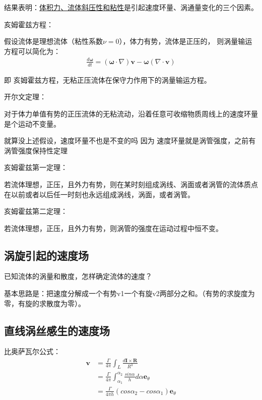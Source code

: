 \documentclass[UTF8,12pt]{article}
\begin{document}
结果表明：\uline{体积力、流体斜压性和粘性}是引起速度环量、涡通量变化的三个因素。

亥姆霍兹方程：

假设流体是理想流体（粘性系数$\nu = 0$），体力有势，流体是正压的，
则涡量输运方程可以简化为：
\begin{align*}
        \frac{d\boldsymbol \omega}{dt} 
        = (\boldsymbol \omega \cdot \nabla) \boldsymbol v
        - \boldsymbol \omega(\nabla \cdot \boldsymbol v)
\end{align*}

即 亥姆霍兹方程，无粘正压流体在保守力作用下的涡量输运方程。

开尔文定理：

对于体力单值有势的正压流体的无粘流动，沿着任意可收缩物质周线上的速度环量是个运动不变量。

{\color{red} 就算没上述假设，速度环量不也是不变的吗 因为 速度环量就是涡管强度，之前有涡管强度保持性定理}

亥姆霍兹第一定理：

若流体理想，正压，且外力有势，则在某时刻组成涡线、涡面或者涡管的流体质点在以前或者以后任一时刻也永远组成涡线，涡面，或者涡管。

亥姆霍兹第二定理：

若流体理想，正压，且外力有势，则涡管的强度在运动过程中恒不变。

\subsection{涡旋引起的速度场}

已知流体的涡量和散度，怎样确定流体的速度？

基本思路是：把速度分解成一个有势v1一个有旋v2两部分之和。（有势的求旋度为零，有旋的求散度为零）。

\subsection{直线涡丝感生的速度场}

比奥萨瓦尔公式：
\begin{align*}
    \boldsymbol v &= \frac{\Gamma}{4\pi} \int_L \frac{d\boldsymbol I\times \boldsymbol R}{R^3}\\
    &= \frac{\Gamma}{4\pi} \int_{\alpha_1}^{\alpha_2} 
          \frac{sin\alpha}{h}d\alpha\boldsymbol e_\theta \\
        &= \frac{\Gamma}{4\pi h}(cos\alpha _2  - cos\alpha_1)\boldsymbol e_\theta
\end{align*}
\end{document}
